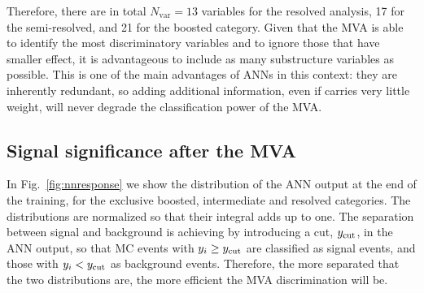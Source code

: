 %
Therefore, there are in total $N_{\mathrm{var}}=13$ variables for the resolved analysis,
17 for the semi-resolved, and 21 for the boosted category.
%
Given that the MVA is able to identify the most discriminatory variables
and to ignore those that have smaller effect, it is advantageous to
include as many substructure variables as possible.
%
This is one of the main advantages of ANNs in this context: they are inherently redundant, so
adding additional information, even if carries very little weight, will never degrade
the classification power of the MVA.

\subsection{Signal significance after the MVA}
\label{sec:signalsignificance}

In Fig.~\ref{fig:nnresponse} we show the distribution of
the ANN output at the end of the training, for the exclusive
boosted, intermediate and resolved categories.
%
The distributions are normalized so that their integral
  adds up to one.
%
The  separation between signal and background is achieving by introducing
a cut, $y_{\rm cut}$, in the ANN output, so that MC events with $y_i\ge
y_{\rm cut}$ are classified as signal events, and those with
 $y_i <
y_{\rm cut}$ as background events.
%
Therefore,
the more separated that the two distributions are, the more efficient
the MVA discrimination will be.



